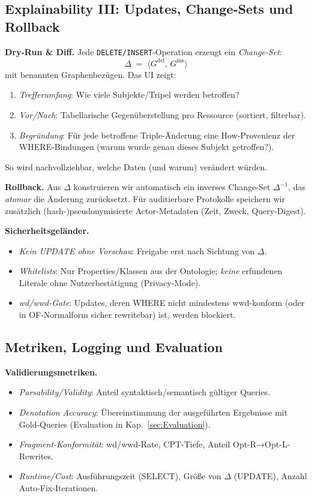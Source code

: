 \subsection{Explainability III: Updates, Change-Sets und Rollback}
\label{sec:explain-updates}

\textbf{Dry-Run \& Diff.} Jede \texttt{DELETE/INSERT}-Operation erzeugt ein \emph{Change-Set}:
\[
\Delta \;=\; \langle G^{\text{del}},\, G^{\text{ins}} \rangle
\]
mit benannten Graphenbezügen. Das UI zeigt:
\begin{enumerate}
  \item \emph{Trefferumfang}: Wie viele Subjekte/Tripel werden betroffen?
  \item \emph{Vor/Nach}: Tabellarische Gegenüberstellung pro Ressource (sortiert, filterbar).
  \item \emph{Begründung}: Für jede betroffene Triple-Änderung eine How-Provenienz der WHERE-Bindungen (warum wurde genau dieses Subjekt getroffen?).
\end{enumerate}
So wird nachvollziehbar, welche Daten (und warum) verändert würden.

\textbf{Rollback.} Aus \(\Delta\) konstruieren wir automatisch ein inverses Change-Set \(\Delta^{-1}\), das \emph{atomar} die Änderung zurücksetzt. Für auditierbare Protokolle speichern wir zusätzlich (hash-)pseudonymisierte Actor-Metadaten (Zeit, Zweck, Query-Digest).

\textbf{Sicherheitsgeländer.} 
\begin{itemize}
  \item \emph{Kein UPDATE ohne Vorschau}: Freigabe erst nach Sichtung von \(\Delta\).
  \item \emph{Whitelists}: Nur Properties/Klassen aus der Ontologie; \emph{keine} erfundenen Literale ohne Nutzerbestätigung (Privacy-Mode).
  \item \emph{wd/wwd-Gate}: Updates, deren WHERE nicht mindestens wwd-konform (oder in OF-Normalform sicher rewritebar) ist, werden blockiert.
\end{itemize}


\subsection{Metriken, Logging und Evaluation}
\label{sec:valid-metriken}

\textbf{Validierungsmetriken.} 
\begin{itemize}
  \item \emph{Parsability/Validity}: Anteil syntaktisch/semantisch gültiger Queries.
  \item \emph{Denotation Accuracy}: Übereinstimmung der ausgeführten Ergebnisse mit Gold-Queries (Evaluation in Kap.~\ref{sec:Evaluation}).
  \item \emph{Fragment-Konformität}: wd/wwd-Rate, CPT-Tiefe, Anteil Opt-R→Opt-L-Rewrites.
  \item \emph{Runtime/Cost}: Ausführungszeit (SELECT), Größe von \(\Delta\) (UPDATE), Anzahl Auto-Fix-Iterationen.
\end{itemize}


